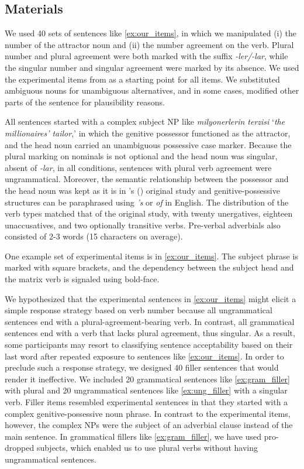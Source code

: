 \documentclass[apacite,linguex]{glossa}\usepackage[]{graphicx}\usepackage[]{color}
\begin{document}
\subsection{Materials}

We used 40 sets of sentences like \ref{ex:our_items}, in which we manipulated (i) the number of the attractor noun and (ii) the number agreement on the verb. Plural number and plural agreement were both marked with the suffix \textit{-ler/-lar}, while the singular number and singular agreement were marked by its absence. We used the experimental items from \citet{LagoEtAl:2019} as a starting point for all items. We substituted ambiguous nouns for unambiguous alternatives, and in some cases, modified other parts of the sentence for plausibility reasons.

All sentences started with a complex subject NP like \textit{milyonerlerin terzisi} `\textit{the millionaires' tailor},' in which the genitive possessor functioned as the attractor, and the head noun carried an unambiguous possessive case marker. Because the plural marking on nominals is not optional and the head noun was singular, absent of \textit{-lar}, in all conditions, sentences with plural verb agreement were ungrammatical. Moreover, the semantic relationship between the possessor and the head noun was kept as it is in \citeauthor{LagoEtAl:2019}'s (\citeyear{LagoEtAl:2019}) original study and genitive-possessive structures can be paraphrased using \textit{'s} or \textit{of} in English. The distribution of the verb types matched that of the original study, with twenty unergatives, eighteen unaccusatives, and two optionally transitive verbs. Pre-verbal adverbials also consisted of 2-3 words (15 characters on average).

One example set of experimental items is in \ref{ex:our_items}. The subject phrase is marked with square brackets, and the dependency between the subject head and the matrix verb is signaled using bold-face.


We hypothesized that the experimental sentences in \ref{ex:our_items} might elicit a simple response strategy based on verb number because all ungrammatical sentences end with a plural-agreement-bearing verb. In contrast, all grammatical sentences end with a verb that lacks plural agreement, thus singular. As a result, some participants may resort to classifying sentence acceptability based on their last word after repeated exposure to sentences like \ref{ex:our_items}. In order to preclude such a response strategy, we designed 40 filler sentences that would render it ineffective. We included 20 grammatical sentences like \ref{ex:gram_filler} with plural and 20 ungrammatical sentences like \ref{ex:ung_filler} with a singular verb. Filler items resembled experimental sentences in that they started with a complex genitive-possessive noun phrase. In contrast to the experimental items, however, the complex NPs were the subject of an adverbial clause instead of the main sentence. In grammatical fillers like \ref{ex:gram_filler}, we have used pro-dropped subjects, which enabled us to use plural verbs without having ungrammatical sentences. 
\end{document}
